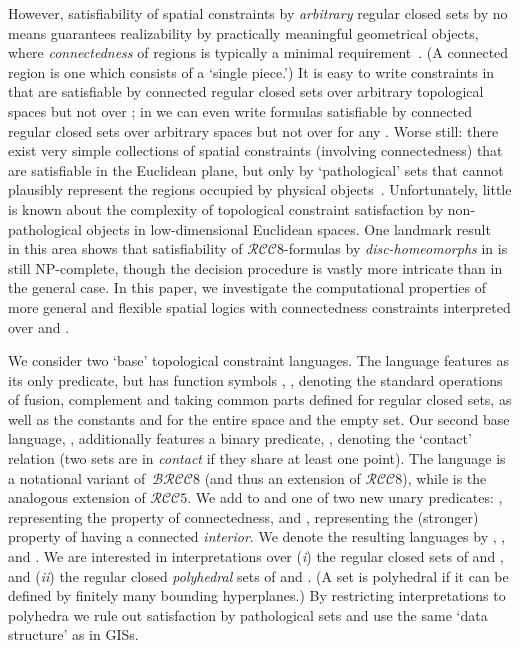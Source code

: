 \documentclass{article}
\newcommand{\NP}{\textsc{NP}}
\newcommand{\RCCE}{\ensuremath{\mathcal{RCC}8}}\newcommand{\RCCF}{\ensuremath{\mathcal{RCC}5}}\newcommand{\BRCCE}{\ensuremath{\mathcal{BRCC}8}}\newcommand{\RCCEc}{\ensuremath{\RCCE{}c}}\newcommand{\RCCEci}{\ensuremath{\RCCE{}c^\circ}}\newcommand{\cBCc}{\ensuremath{\mathcal{C}c}}\newcommand{\cBCci}{\ensuremath{\mathcal{C}c^\circ}}
\begin{document}
However, satisfiability of spatial constraints by {\em arbitrary}
regular closed sets by no means guarantees realizability by
practically meaningful geometrical objects, where {\em connectedness}
of regions is typically a minimal
requirement~\cite{Borgo96,ijcai:Cohn&Renz08}.  (A connected region is
one which consists of a `single piece.')  It is easy to write
constraints in  that are satisfiable by connected regular
closed sets over arbitrary topological spaces but not over ; in
 we can even write formulas satisfiable by connected regular
closed sets over arbitrary spaces but not over  for any .
Worse still: there exist very simple collections of spatial
constraints (involving connectedness) that are satisfiable in the
Euclidean plane, but only by `pathological' sets that cannot plausibly
represent the regions occupied by physical objects~\cite{ijcai:HSL2}.
Unfortunately, little is known about the complexity of topological
constraint satisfaction by non-pathological objects in low-dimensional
Euclidean spaces. One landmark result~\cite{ijcai:iscloes:sss03} in
this area shows that satisfiability of \RCCE-formulas by
\emph{disc-homeomorphs} in  is still \NP-complete, though the
decision procedure is vastly more intricate than in the general
case. In this paper, we investigate the computational properties of
more general and flexible spatial logics with connectedness
constraints interpreted over  and .

We consider two `base' topological
constraint languages.  The language  features  as its
only predicate, but has function symbols , ,  denoting
the standard operations of fusion, complement and taking common parts
defined for regular closed sets, as well as the constants  and 
for the entire space and the empty set. Our second base language,
, additionally features a binary predicate, , denoting the
`contact' relation (two sets are in {\em contact} if they share at
least one point).  The language  is a notational variant
of~\BRCCE{} (and thus an extension of \RCCE), while  is the
analogous extension of \RCCF{}. We add to  and  one of
two new unary predicates: , representing the property of
connectedness, and , representing the (stronger) property of
having a connected \emph{interior}. We denote the resulting languages
by , \!,  and \!. We are interested 
in interpretations over ({\em i}) the regular closed sets of 
and , and ({\em ii}) the regular closed \emph{polyhedral} sets
of  and .  (A set is polyhedral if it can be defined by
finitely many bounding hyperplanes.) By restricting interpretations to
polyhedra we rule out satisfaction by pathological sets and use the
same `data structure' as in GISs.
\end{document}
